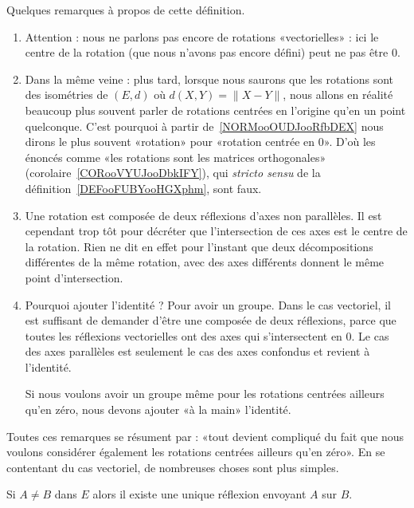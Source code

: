 \begin{normaltext}
	Quelques remarques à propos de cette définition.
	\begin{enumerate}
		\item
		      Attention : nous ne parlons pas encore de rotations «vectorielles» : ici le centre de la rotation (que nous n'avons pas encore défini) peut ne pas être \( 0\).
		\item
		      Dans la même veine : plus tard, lorsque nous saurons que les rotations sont des isométries de \( (E,d)\) où \( d(X,Y)=\| X-Y \|\), nous allons en réalité beaucoup plus souvent parler de rotations centrées en l'origine qu'en un point quelconque. C'est pourquoi à partir de~\ref{NORMooOUDJooRfbDEX} nous dirons le plus souvent «rotation»  pour «rotation centrée en \( 0\)». D'où les énoncés comme «les rotations sont les matrices orthogonales» (corolaire~\ref{CORooVYUJooDbkIFY}), qui \emph{stricto sensu} de la définition~\ref{DEFooFUBYooHGXphm}, sont faux.
		\item
		      Une rotation est composée de deux réflexions d'axes non parallèles. Il est cependant trop tôt pour décréter que l'intersection de ces axes est le centre de la rotation. Rien ne dit en effet pour l'instant que deux décompositions différentes de la même rotation, avec des axes différents donnent le même point d'intersection.
		\item
		      Pourquoi ajouter l'identité  ? Pour avoir un groupe. Dans le cas vectoriel, il est suffisant de demander d'être une composée de deux réflexions, parce que toutes les réflexions vectorielles ont des axes qui s'intersectent en \( 0\). Le cas des axes parallèles est seulement le cas des axes confondus et revient à l'identité.

		      Si nous voulons avoir un groupe même pour les rotations centrées ailleurs qu'en zéro, nous devons ajouter «à la main» l'identité.
	\end{enumerate}

	Toutes ces remarques se résument par : «tout devient compliqué du fait que nous voulons considérer également les rotations centrées ailleurs qu'en zéro». En se contentant du cas vectoriel, de nombreuses choses sont plus simples.
\end{normaltext}

\begin{corollary}       \label{CORooNKKIooPGOUJl}
	Si \( A\neq B\) dans \( E\) alors il existe une unique réflexion envoyant \( A\) sur \( B\).
\end{corollary}

